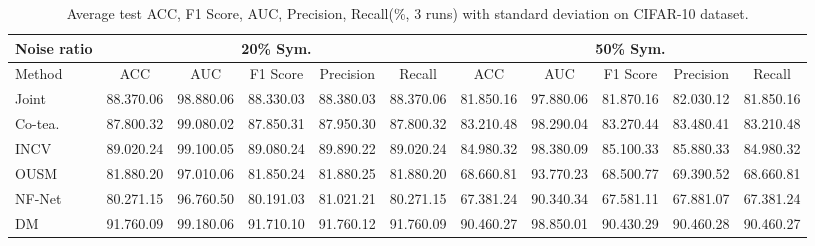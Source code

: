 \begin{table*}[]
\scriptsize
\centering
\caption{{Average test ACC, F1 Score, AUC, {Precision}, Recall(\%, 3 runs) with standard deviation on CIFAR-10 dataset.}}
\label{table:objCIFAR}
\begin{tabular}{@{}lcccccccccc@{}}
\toprule
\multicolumn{1}{c}{Noise ratio} & \multicolumn{5}{c}{20\% Sym.}                                                                                    & \multicolumn{5}{c}{50\% Sym.}                                                                                    \\ \midrule
Method                & ACC                  & AUC                  & F1 Score             & {Precision}                  & Recall               & ACC                  & AUC                  & F1 Score             & {Precision}                  & Recall               \\ \midrule
Joint                     & 88.370.06          & 98.880.06          & 88.330.03          & 88.380.03          & 88.370.06          & 81.850.16          & 97.880.06          & 81.870.16          & 82.030.12          & 81.850.16          \\
Co-tea.                     & 87.800.32           & 99.080.02          & 87.850.31          & 87.950.30          & 87.800.32           & 83.210.48          & 98.290.04          & 83.270.44          & 83.480.41          & 83.210.48          \\
INCV                            & 89.020.24          & 99.100.05           & 89.080.24          & 89.890.22          & 89.020.24          & 84.980.32          & 98.380.09          & 85.100.33           & 85.880.33          & 84.980.32          \\
OUSM                       & 81.880.20          & 97.010.06          & 81.850.24          & 81.880.25          & 81.880.20          & 68.660.81          & 93.770.23          & 68.500.77          & 69.390.52          & 68.660.81          \\
NF-Net                          & 80.271.15          & 96.760.50          & 80.191.03          & 81.021.21          & 80.271.15          & 67.381.24          & 90.340.34          & 67.581.11          & 67.881.07          & 67.381.24          \\
DM                       & 91.760.09          & 99.180.06          & 91.710.10          & 91.760.12          & 91.760.09          & 90.460.27          & 98.850.01          & 90.430.29          & 90.460.28          & 90.460.27          \\

\end{tabular}
\end{table*}
